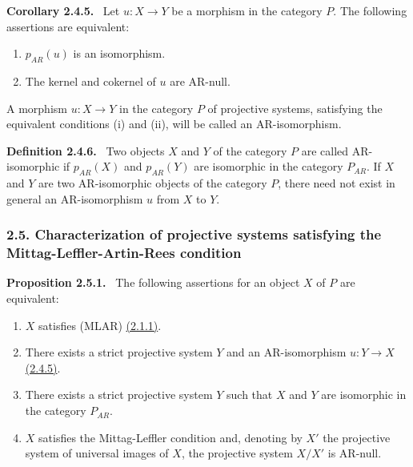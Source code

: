 \documentclass[11pt]{article}
\newenvironment{statement}[1]{\par\medskip\noindent\textbf{#1.}\ }{\par\medskip}
\begin{document}
\label{sga5:V:corollary:2.4.5}\begin{statement}{Corollary 2.4.5}
Let $u:X\to Y$ be a morphism in the category $P$. The following assertions are equivalent:
\begin{enumerate}[label=(\roman*)]
\item $p_{AR}(u)$ is an isomorphism.
\item The kernel and cokernel of $u$ are AR-null.
\end{enumerate}
A morphism $u:X\to Y$ in the category $P$ of projective systems, satisfying the equivalent conditions (i) and (ii), will be called an AR-isomorphism.
\end{statement}

\label{sga5:V:definition:2.4.6}\begin{statement}{Definition 2.4.6}
Two objects $X$ and $Y$ of the category $P$ are called AR-isomorphic if $p_{AR}(X)$ and $p_{AR}(Y)$ are isomorphic in the category $P_{AR}$. If $X$ and $Y$ are two AR-isomorphic objects of the category $P$, there need not exist in general an AR-isomorphism $u$ from $X$ to $Y$.
\end{statement}

\subsubsection*{2.5. Characterization of projective systems satisfying the Mittag-Leffler-Artin-Rees condition}\label{sga5:V:subsubsection:2.5}
\label{sga5:V:proposition:2.5.1}\begin{statement}{Proposition 2.5.1}
The following assertions for an object $X$ of $P$ are equivalent:
\begin{enumerate}[label=(\roman*)]
\item $X$ satisfies (MLAR) \hyperref[sga5:V:definition:2.1.1]{(2.1.1)}.
\item There exists a strict projective system $Y$ and an AR-isomorphism $u:Y\to X$ \hyperref[sga5:V:corollary:2.4.5]{(2.4.5)}.
\item There exists a strict projective system $Y$ such that $X$ and $Y$ are isomorphic in the category $P_{AR}$.
\item $X$ satisfies the Mittag-Leffler condition and, denoting by $X'$ the projective system of universal images of $X$, the projective system $X/X'$ is AR-null.
\end{enumerate}
\end{statement}
\end{document}
